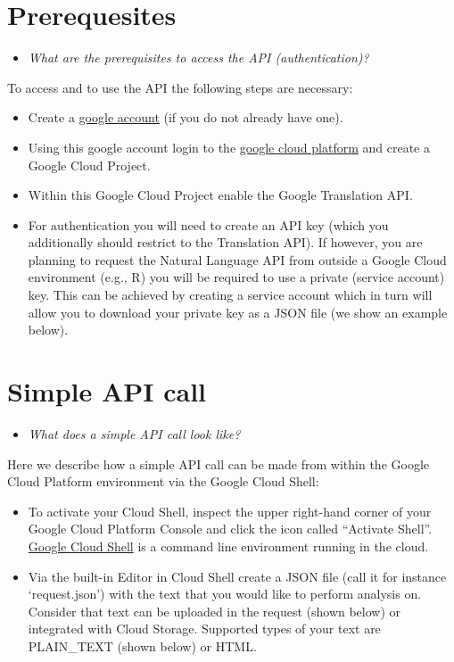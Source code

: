 \documentclass[
]{book}
\providecommand{\tightlist}{%
  \setlength{\itemsep}{0pt}\setlength{\parskip}{0pt}}
\begin{document}
\hypertarget{prerequesites-1}{%
\section{Prerequesites}\label{prerequesites-1}}

\begin{itemize}
\tightlist
\item
  \emph{What are the prerequisites to access the API (authentication)? }
\end{itemize}

To access and to use the API the following steps are necessary:

\begin{itemize}
\item
  Create a \href{\%22https://www.google.com/account/about/\%22}{google account} (if you do not already have one).
\item
  Using this google account login to the \href{\%22https://cloud.google.com/\%22}{google cloud platform} and create a Google Cloud Project.
\item
  Within this Google Cloud Project enable the Google Translation API.
\item
  For authentication you will need to create an API key (which you additionally should restrict to the Translation API). If however, you are planning to request the Natural Language API from outside a Google Cloud environment (e.g., R) you will be required to use a private (service account) key. This can be achieved by creating a service account which in turn will allow you to download your private key as a JSON file (we show an example below).
\end{itemize}

\hypertarget{simple-api-call-1}{%
\section{Simple API call}\label{simple-api-call-1}}

\begin{itemize}
\tightlist
\item
  \emph{What does a simple API call look like?}
\end{itemize}

Here we describe how a simple API call can be made from within the Google Cloud Platform environment via the Google Cloud Shell:

\begin{itemize}
\item
  To activate your Cloud Shell, inspect the upper right-hand corner of your Google Cloud Platform Console and click the icon called ``Activate Shell''. \href{\%22https://cloud.google.com/shell/\#how_do_i_get_started\%22}{Google Cloud Shell} is a command line environment running in the cloud.
\item
  Via the built-in Editor in Cloud Shell create a JSON file (call it for instance `request.json') with the text that you would like to perform analysis on. Consider that text can be uploaded in the request (shown below) or integrated with Cloud Storage. Supported types of your text are PLAIN\_TEXT (shown below) or HTML.
\end{itemize}
\end{document}
